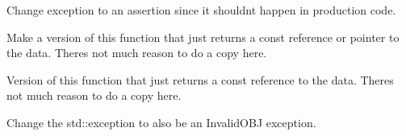 \begin{DoxyRefList}
Change exception to an assertion since it shouldn\textquotesingle{}t happen in production code.  
\item[Member \mbox{\hyperlink{a01297_af2d1b696c55aa036cff585d2e7eba50b}{HF::Geometry::Mesh\+Info$<$ numeric\+\_\+type $>$::Get\+Indexed\+Vertices}} () const]\label{a00386__todo000012}%
%
 Make a version of this function that just returns a const reference or pointer to the data. There\textquotesingle{}s not much reason to do a copy here.  
\item[Member \mbox{\hyperlink{a01297_afddea10734ba213b2bb5cc148c24c942}{HF::Geometry::Mesh\+Info$<$ numeric\+\_\+type $>$::get\+Raw\+Indices}} () const]\label{a00386__todo000013}%
%
 Version of this function that just returns a const reference to the data. There\textquotesingle{}s not much reason to do a copy here. 
\item[Member \mbox{\hyperlink{a01297_a233273a26ac7a3ea3f06a569b7b241f4}{HF::Geometry::Mesh\+Info$<$ numeric\+\_\+type $>$::Mesh\+Info}} (const std\+::vector$<$ std\+::array$<$ numeric\+\_\+type, 3 $>$$>$ \&vertices, int id, std\+::string name=\char`\"{}\char`\"{})]\label{a00386__todo000008}%
%
Change the std\+::exception to also be an Invalid\+O\+BJ exception. 


\end{DoxyRefList}
